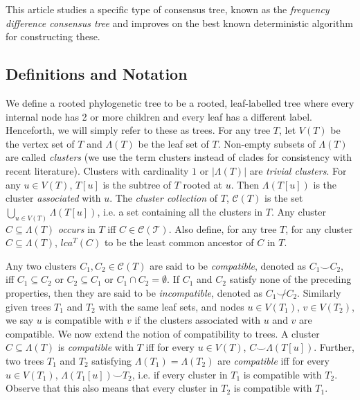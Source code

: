 \documentclass{article}
\newcommand{\compatible}{\smile}
\newcommand{\leafset}{\Lambda}
\begin{document}
    This article studies a specific type of consensus tree, known as the \textit{frequency difference consensus tree} \cite{goloboff2003improvements} and improves on the best known deterministic algorithm for constructing these.

    \subsection{Definitions and Notation}
    We define a rooted phylogenetic tree to be a rooted, leaf-labelled tree where every internal node has 2 or more children and every leaf has a different label. Henceforth, we will simply refer to these as trees. For any tree $T$, let $V(T)$ be the vertex set of $T$ and $\leafset(T)$ be the leaf set of $T$. Non-empty subsets of $\leafset(T)$ are called \textit{clusters} (we use the term clusters instead of clades for consistency with recent literature). Clusters with cardinality $1$ or $|\leafset(T)|$ are \textit{trivial clusters}. For any $u \in V(T)$, $T[u]$ is the subtree of $T$ rooted at $u$. Then $\leafset(T[u])$ is the cluster \textit{associated} with $u$. The \textit{cluster collection} of $T$, $\mathcal{C}(T)$ is the set $\bigcup_{u \in V(T)} {\leafset(T[u])}$, i.e. a set containing all the clusters in $T$. Any cluster $C \subseteq \leafset(T)$ \textit{occurs} in $T$ iff $C \in \mathcal{C(T)}$. Also define, for any tree $T$, for any cluster $C \subseteq \leafset(T)$, $lca^T(C)$ to be the least common ancestor of $C$ in $T$.

    Any two clusters $C_1, C_2 \in \mathcal{C}(T)$ are said to be \textit{compatible}, denoted as $C_1 \compatible C_2$, iff $C_1 \subseteq C_2$ or $C_2 \subseteq C_1$ or $C_1 \cap C_2 = \emptyset$. If $C_1$ and $C_2$ satisfy none of the preceding properties, then they are said to be \textit{incompatible}, denoted as $C_1 \not\compatible C_2$. Similarly given trees $T_1$ and $T_2$ with the same leaf sets, and nodes $u \in V(T_1)$, $v \in V(T_2)$, we say $u$ is compatible with $v$ if the clusters associated with $u$ and $v$ are compatible. We now extend the notion of compatibility to trees. A cluster $C \subseteq \leafset(T)$ is \textit{compatible} with $T$ iff for every $u \in V(T)$, $C \compatible \leafset(T[u])$. Further, two trees $T_1$ and $T_2$ satisfying $\leafset(T_1) = \leafset(T_2)$ are \textit{compatible} iff for every $u \in V(T_1)$, $\leafset(T_1[u]) \compatible T_2$, i.e. if every cluster in $T_1$ is compatible with $T_2$. Observe that this also means that every cluster in $T_2$ is compatible with $T_1$.
\end{document}
